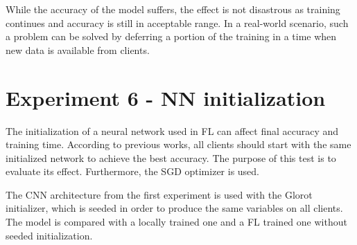     
\begin{center}
\end{center}

While the accuracy of the model suffers, the effect is not disastrous as training continues and accuracy is still in acceptable range. In a real-world scenario, such a problem can be solved by deferring a portion of the training in a time when new data is available from clients.

\clearpage

\section{Experiment 6 - NN initialization}
The initialization of a neural network used in FL can affect final accuracy and training time. According to previous works, all clients should start with the same initialized network to achieve the best accuracy. The purpose of this test is to evaluate its effect. Furthermore, the SGD optimizer is used.

\medskip
The CNN architecture from the first experiment is used with the Glorot initializer, which is seeded in order to produce the same variables on all clients. The model is compared with a locally trained one and a FL trained one without seeded initialization.

\medskip

